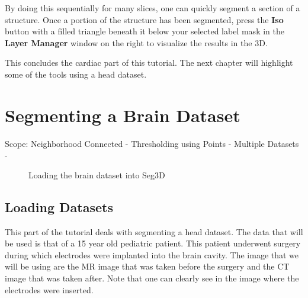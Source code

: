 \documentclass[fleqn,11pt,openany]{book}
\begin{document}
By doing this sequentially for many slices, one can quickly segment a section of a structure. Once a portion of the structure has been segmented, press the {\bf Iso} button with a filled triangle beneath it below your selected label mask in the {\bf Layer Manager} window on the right to visualize the results in the 3D.

This concludes the cardiac part of this tutorial. The next chapter will highlight some of the tools using a head dataset.


\chapter{Segmenting a Brain Dataset}

\begin{introduction}
Scope: Neighborhood Connected - Thresholding using Points - Multiple Datasets - 
\end{introduction}

\begin{figure}
\caption{Loading the brain dataset into Seg3D}\label{fig:LoadingBrainDataSet}
\end{figure}

\section{Loading Datasets}

This part of the tutorial deals with segmenting a head dataset. The data that will be used is that of a 15 year old pediatric patient. This patient underwent surgery during which electrodes were implanted into the brain cavity. The image that we will be using are the MR image that was taken before the surgery and the CT image that was taken after. Note that one can clearly see in the image where the electrodes were inserted.
\end{document}
